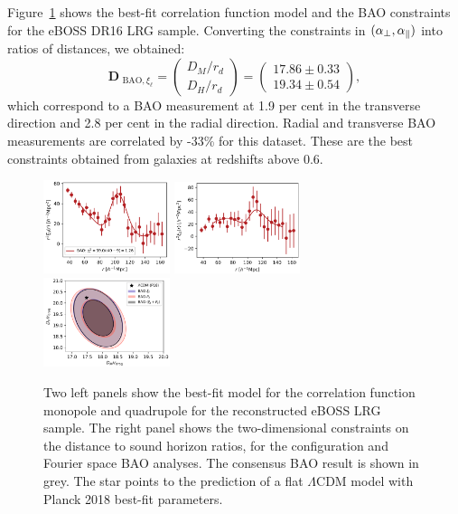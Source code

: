 Figure~\ref{fig:eboss_dr16_lrg_bao} shows the best-fit correlation function model and 
the BAO constraints for the eBOSS DR16 LRG sample. 
Converting the constraints in $({\alpha_\perp},{\alpha_\parallel})$ into ratios of distances, we obtained: 
\begin{equation}
    \mathbf{D}_{\text{ BAO},{\xi_\ell}} =
    \begin{pmatrix}
   D_M/r_d \\
   D_H/r_d 
    \end{pmatrix}=
    \begin{pmatrix}
     17.86 \pm 0.33 \\
     19.34 \pm 0.54 
     \end{pmatrix},
\end{equation}
which correspond to a BAO measurement at 1.9 per cent in the transverse direction 
and 2.8 per cent in the radial direction. 
Radial and transverse BAO measurements are correlated by -33\% for this dataset.  
These are the best constraints obtained from galaxies at redshifts above $0.6$.

\begin{figure} 
    \centering 
    \includegraphics[width=0.33\textwidth]{fig/galaxies/eboss_dr16_lrg_bao_mono.png}
    \includegraphics[width=0.33\textwidth]{fig/galaxies/eboss_dr16_lrg_bao_quad.png}
    \includegraphics[width=0.33\textwidth]{fig/galaxies/eboss_dr16_lrg_bao_contours.png}
    \caption{Two left panels show the best-fit model for the correlation function monopole and 
    quadrupole for the reconstructed eBOSS LRG sample. The right panel shows the two-dimensional 
    constraints on the distance to sound horizon ratios, for the configuration and Fourier space 
    BAO analyses. The consensus BAO result is shown in grey. The star points to the prediction 
    of a flat $\Lambda$CDM model with Planck 2018 best-fit parameters. }
    \label{fig:eboss_dr16_lrg_bao}
\end{figure}


